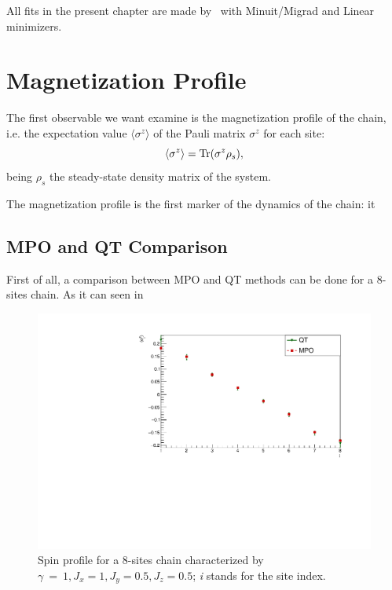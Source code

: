 All fits in the present chapter are made by~\cite{root_cern} with Minuit/Migrad and Linear minimizers.

\section{Magnetization Profile}
\label{sec:magn_profile}
The first observable we want examine is the magnetization profile of the chain, i.e. the expectation value $\langle \sigma^z \rangle$ of the Pauli matrix $\sigma^z$ for each site:
\begin{equation*}
    \langle \sigma^z \rangle = \operatorname{Tr}(\sigma^z \rho_s),
\end{equation*}
being $\rho_s$ the steady-state density matrix of the system.

The magnetization profile is the first marker of the dynamics of the chain: it 

\subsection{MPO and QT Comparison}
First of all, a comparison between MPO and QT methods can be done for a 8-sites chain. As it can seen in 

\begin{figure}[H]
    \centering
    \includegraphics[scale=0.7]{Figures/8sites/LMComparison_8sJ10505.pdf}
    \caption{Spin profile for a 8-sites chain characterized by $\gamma~=~1, J_x=1, J_y=0.5, J_z=0.5$; \emph{i} stands for the site index.}
    \label{fig:8sites_LMcomparisonJz05}
\end{figure}

